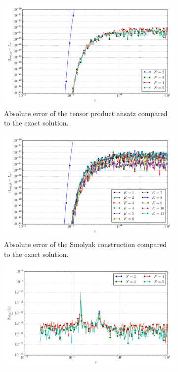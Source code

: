 \documentclass[a4paper,10pt]{article}
\begin{document}
\begin{figure}[ht!]
\begin{subfigure}[t]{0.5\linewidth}
    \includegraphics[width=\linewidth]{./plots/tp_sg_8d_conv_eps_(2,0,0,0,0,0,0,0)_(2,0,0,0,0,0,0,0)_err_nsd_tp.pdf}
    \caption{Absolute error of the tensor product ansatz compared to the exact solution.}
    \label{fig:tp_sg_8d_conv_p_20000000_20000000_err_nsd_tp}
  \end{subfigure}
  \begin{subfigure}[t]{0.5\linewidth}
    \includegraphics[width=\linewidth]{./plots/tp_sg_8d_conv_eps_(2,0,0,0,0,0,0,0)_(2,0,0,0,0,0,0,0)_err_nsd_gk.pdf}
    \caption{Absolute error of the Smolyak construction compared to the exact solution.}
    \label{fig:tp_sg_8d_conv_p_20000000_20000000_err_nsd_gk}
  \end{subfigure}
  \begin{subfigure}[t]{0.5\linewidth}
    \includegraphics[width=\linewidth]{./plots/tp_sg_8d_conv_eps_(2,0,0,0,0,0,0,0)_(2,0,0,0,0,0,0,0)_err_rel_nsd_tp.pdf}

\end{subfigure}
\end{figure}
\end{document}
